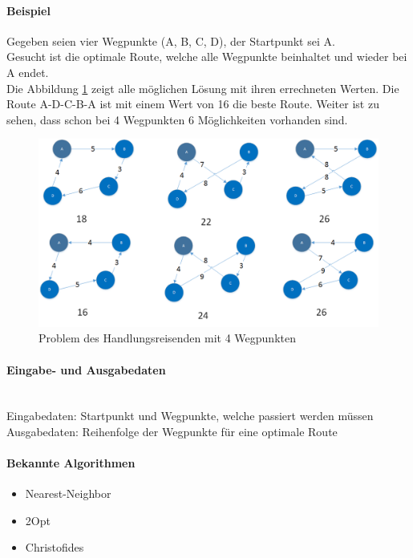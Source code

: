 	\paragraph{Beispiel} Gegeben seien vier Wegpunkte (A, B, C, D), der Startpunkt sei A.\\
	Gesucht ist die optimale Route, welche alle Wegpunkte beinhaltet und wieder bei A endet.\\
	Die Abbildung \ref{fig:tsp_example} zeigt alle möglichen Lösung mit ihren errechneten Werten. Die Route A-D-C-B-A ist mit einem Wert von 16 die beste Route. Weiter ist zu sehen, dass schon bei 4 Wegpunkten 6 Möglichkeiten vorhanden sind.
\begin{figure}[h]
\centering
\includegraphics[scale=0.6]{images/visio/tsp.png}
\caption{Problem des Handlungsreisenden mit 4 Wegpunkten}
\label{fig:tsp_example}
\end{figure}

	\paragraph{Eingabe- und Ausgabedaten}\mbox{}\\
	Eingabedaten: Startpunkt und Wegpunkte, welche passiert werden müssen\\
	Ausgabedaten: Reihenfolge der Wegpunkte für eine optimale Route

	\paragraph{Bekannte Algorithmen}\cite{tsp_algorithmen} \cite{tsp_semesterarbeit}
	\begin{itemize}
		\item Nearest-Neighbor
		\item 2Opt
		\item Christofides
	\end{itemize}


